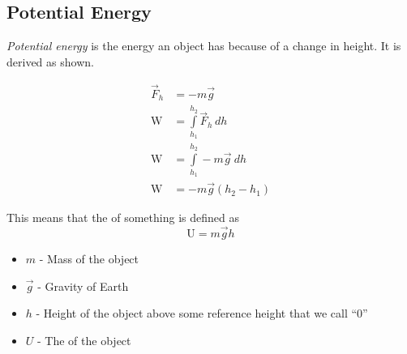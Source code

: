 \subsection{Potential Energy}\label{subsec:Potential Energy}
\begin{definition}\label{def:Potential Energy}
  \emph{Potential energy} is the energy an object has because of a change in height.
  It is derived as shown.

  \begin{align*}
    \vec{F}_{h} &= -m \vec{g} \\
    \text{W} &= \int\limits_{h_{1}}^{h_{2}} \vec{F}_{h} \, dh \\
    \text{W} &= \int\limits_{h_{1}}^{h_{2}} -m \vec{g} \: dh \\
    \text{W} &= -m \vec{g} \left( h_{2}-h_{1} \right)
  \end{align*}

  This means that the  of something is defined as
  \begin{equation}\label{eq:Potential Energy}
    \text{U} = m \vec{g} h
  \end{equation}
  \begin{itemize}[noitemsep, nolistsep]
    \item $m$ - Mass of the object
    \item $\vec{g}$ - Gravity of Earth
    \item $h$ - Height of the object above some reference height that we call ``0''
    \item $U$ - The  of the object
  \end{itemize}
\end{definition}


